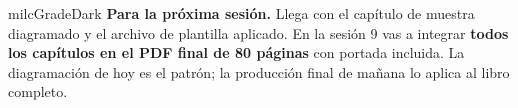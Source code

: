 \documentclass[11pt,letterpaper]{article}
\begin{document}
\begin{infoband}{milcGradeDark}
\textbf{Para la próxima sesión.} Llega con el capítulo de muestra diagramado y el archivo de plantilla aplicado. En la sesión 9 vas a integrar \textbf{todos los capítulos en el PDF final de 80 páginas} con portada incluida. La diagramación de hoy es el patrón; la producción final de mañana lo aplica al libro completo.
\end{infoband}
\end{document}

